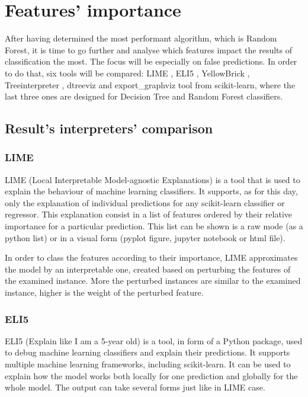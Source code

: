 \chapter{Features' importance}

After having determined the most performant algorithm, which is Random Forest, it is time to go further and analyse which features impact the results of classification the most. The focus will be especially on false predictions. In order to do that, six tools will be compared: LIME \cite{lime}, ELI5 \cite{mikhail_korobov_eli5_nodate}, YellowBrick \cite{bengfort_yellowbrick_2018}, Treeinterpreter \cite{ando_saabas_treeinterpreter_nodate}, dtreeviz \cite{terence_parr_dtreeviz_nodate} and export\_graphviz tool from scikit-learn, where the last three ones are designed for Decision Tree and Random Forest classifiers.

\section{Result's interpreters' comparison}
\subsection{LIME} %
LIME (Local Interpretable Model-agnostic Explanations) is a tool that is used to explain the behaviour of machine learning classifiers. It supports, as for this day, only the explanation of individual predictions for any scikit-learn classifier or regressor. This explanation consist in a list of features ordered by their relative importance for a particular prediction. This list can be shown is a raw mode (as a python list) or in a visual form (pyplot figure, jupyter notebook or html file).

In order to class the features according to their importance, LIME approximates the model by an interpretable one, created based on perturbing the features of the examined instance. More the perturbed instances are similar to the examined instance, higher is the weight of the perturbed feature.

\subsection{ELI5}
ELI5 (Explain like I am a 5-year old) is a tool, in form of a Python package, used to debug machine learning classifiers and explain their predictions. It supports multiple machine learning frameworks, including scikit-learn. It can be used to explain how the model works both locally for one prediction and globally for the whole model. The output can take several forms just like in LIME case.


